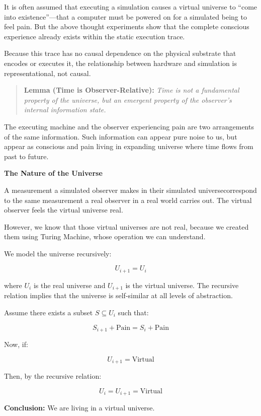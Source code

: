 \documentclass[11pt]{article}
\begin{document}
It is often assumed that executing a simulation causes a virtual universe to “come into existence”—that a computer must be powered on for a simulated being to feel pain.
But the above thought experiments show that the complete conscious experience already exists within the static execution trace.

Because this trace has no causal dependence on the physical substrate that encodes or executes it, the relationship between hardware and simulation is representational, not causal.

\begin{quote}
  \textbf{Lemma (Time is Observer-Relative):} \emph{Time is not a fundamental property of the universe, but an emergent property of the observer’s internal information state.}
\end{quote}

The executing machine and the observer experiencing pain are two arrangements of the same information. Such information can appear pure noise to us, but appear as conscious and pain living in expanding universe where time flows from past to future.


\textbf{The Nature of the Universe}

A measurement a simulated observer makes in their simulated universecorrespond to the same measurement a real observer in a real world carries out. The virtual observer feels the virtual universe real.

However, we know that those virtual universes are not real, because we created them using Turing Machine, whose operation we can understand.

We model the universe recursively:

\[
  U_{i+1} = U_i
\]

where \( U_i \) is the real universe and \( U_{i+1} \) is the virtual universe. The recursive relation implies that the universe is self-similar at all levels of abstraction.

Assume there exists a subset \( S \subseteq U_i \) such that:

\[
  S_{i+1} + \text{Pain} = S_i + \text{Pain}
\]

Now, if:

\[
  U_{i+1} = \text{Virtual}
\]

Then, by the recursive relation:

\[
  U_i = U_{i+1} = \text{Virtual}
\]

\textbf{Conclusion:} We are living in a virtual universe.
\end{document}
